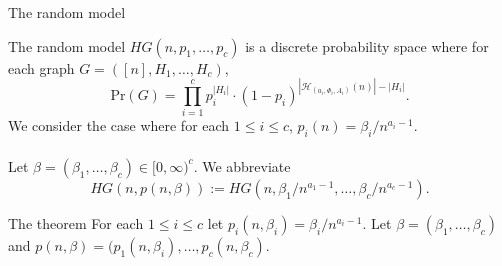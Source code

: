 \documentclass[handout, 11pt]{beamer}
\begin{document}
	\begin{frame}{The random model}

	The random model $HG(n,p_1,\dots, p_c)$ is a discrete probability space where for each graph 
	$G=([n],H_1,\dots,H_c)$,
	\[ \mathrm{Pr}(G)=\prod_{i=1}^{c} p_i^{|H_i|}\cdot (1-p_i)^{|\mathcal{H}_{(a_i,\Phi_i,A_i)}(n)|-|H_i|} . \]
	We consider the case where for each $1\leq i \leq c$,  $p_i(n)=\beta_i/n^{a_i-1}$.
	\\~\\ 
	Let $\beta=(\beta_1,\dots, \beta_c)\in [0,\infty)^c$. We abbreviate
	\[HG(n,p(n,\beta)):= HG(n,\beta_1/n^{a_1-1},\dots, \beta_c/n^{a_c-1}). \]
	
	\end{frame}
	
	\begin{frame}{The theorem}
		For each $1\leq i \leq c$ let $p_i(n,\beta_i)=\beta_i/n^{a_i-1}$. Let $\beta=(\beta_1,\dots,\beta_c)$ and 
		$p(n,\beta)=(p_1(n,\beta_i),\dots,p_c(n,\beta_c)$.
		
		\end{frame}
\end{document}
